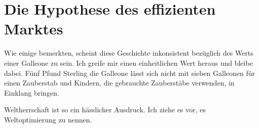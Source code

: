 \chapter{Die Hypothese des effizienten Marktes}

\begin{chapterOpeningAuthorNote}
%
Wie einige bemerkten, scheint diese Geschichte inkonsistent bezüglich des Werts einer Galleone zu sein. Ich greife mir einen einheitlichen Wert heraus und bleibe dabei. Fünf Pfund Sterling die Galleone lässt sich nicht mit sieben Galleonen für einen Zauberstab und Kindern, die gebrauchte Zauberstäbe verwenden, in Einklang bringen.
\end{chapterOpeningAuthorNote}
\begin{chapterOpeningQuote}
Weltherrschaft ist so ein hässlicher Ausdruck. Ich ziehe es vor, es Weltoptimierung zu nennen.%
\end{chapterOpeningQuote}

